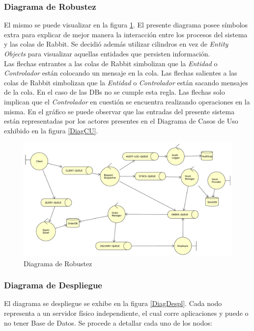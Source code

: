 \documentclass[a4paper,10pt]{article}
\begin{document}
        \subsubsection{Diagrama de Robustez}
        El mismo se puede visualizar en la figura \ref{DiagRobustez}. El 
        presente diagrama posee símbolos extra para explicar de mejor manera
        la interacción entre los procesos del sistema y las colas de Rabbit.
        Se decidió además utilizar cilindros en vez de \textit{Entity Objects}
        para visualizar aquellas entidades que persisten información. \\
        \indent Las flechas entrantes a las colas de Rabbit simbolizan que 
        la \textit{Entidad} o \textit{Controlador} están colocando un mensaje
        en la cola. Las flechas salientes a las colas de Rabbit simbolizan que
        la \textit{Entidad} o \textit{Controlador} están sacando mensajes de
        la cola. En el caso de las DBs no se cumple esta regla. Las flechas
        solo implican que el \textit{Controlador} en cuestión se encuentra
        realizando operaciones en la misma.
        \indent En el gráfico se puede observar que las entradas del presente
        sistema están representadas por los actores presentes en el Diagrama
        de Casos de Uso exhibido en la figura \ref{DiagCU}.  
        

        \begin{figure}[H]                                             
            \centering                                                   
            \includegraphics[width=20cm,angle=90,origin=c]{Imagenes/robustez.pdf}        
            \caption{Diagrama de Robustez} \label{DiagRobustez}
        \end{figure}

        \newpage
        \subsubsection{Diagrama de Despliegue}
        El diagrama se despliegue se exhibe en la figura \ref{DiagDespl}. Cada 
        nodo representa a un servidor físico independiente, el cual corre 
        aplicaciones y puede o no tener Base de Datos. Se procede a detallar
        cada uno de los nodos:
\end{document}

